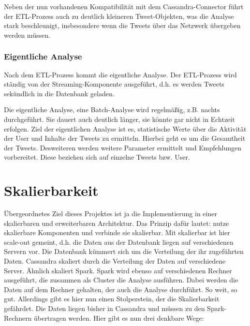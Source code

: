 Neben der nun vorhandenen Kompatibilität mit dem Cassandra-Connector
führt der ETL-Prozess auch zu deutlich kleineren Tweet-Objekten, was
die Analyse stark beschleunigt, insbesondere wenn die Tweets über das
Netzwerk übergeben werden müssen.

\subsubsection{Eigentliche
Analyse}
Nach dem ETL-Prozess kommt die eigentliche Analyse. Der ETL-Prozess wird
ständig von der Streaming-Komponente ausgeführt, d.h. es werden Tweets
sekündlich in die Datenbank geladen.

Die eigentliche Analyse, eine Batch-Analyse wird regelmäßig, z.B. nachts
durchgeführt. Sie dauert auch deutlich länger, sie könnte gar nicht in
Echtzeit erfolgen. Ziel der eigentlichen Analyse ist es, statistische
Werte über die Aktivität der User und Inhalte der Tweets zu ermitteln.
Hierbei geht es um die Gesamtheit der Tweets. Desweiteren werden
weitere Parameter ermittelt und Empfehlungen vorbereitet. Diese
beziehen sich auf einzelne Tweets bzw. User.

\section{Skalierbarkeit}
Übergeordnetes Ziel dieses Projektes ist ja die Implementierung in einer
skalierbaren und erweiterbaren Architektur. Das Prinzip dafür lautet:
nutze skalierbare Komponenten und verbinde sie skalierbar. Mit
skalierbar ist hier scale-out gemeint, d.h. die Daten aus der Datenbank
liegen auf verschiedenen Servern vor. Die Datenbank kümmert sich um die
Verteilung der ihr zugeführten Daten. Cassandra skaliert durch die
Verteilung der Daten auf verschiedene Server. Ähnlich skaliert Spark.
Spark wird ebenso auf verschiedenen Rechner ausgeführt, die zusammen
als Cluster die Analyse ausführen. Dabei werden die Daten auf dem
Rechner gehalten, der auch die Analyse durchführt. So weit, so gut.
Allerdings gibt es hier nun einen Stolperstein, der die Skalierbarkeit
gefährdet. Die Daten liegen bisher in Cassandra und müssen zu den
Spark-Rechnern übertragen werden. Hier gibt es nun drei denkbare Wege:

